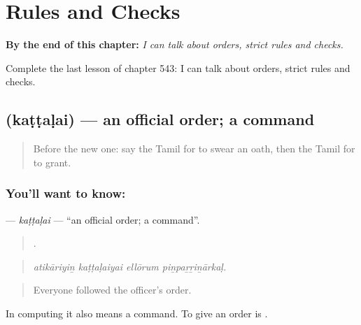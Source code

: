 
\chapter{Rules and Checks}
\label{ch:ta-rules-and-checks}

\begin{chapteropening}
\textbf{By the end of this chapter:} \emph{I can talk about orders, strict rules and checks.}

Complete the last lesson of chapter 543: I can talk about orders, strict rules and checks.
\end{chapteropening}

\section[\texorpdfstring{\ta{கட்டளை} (kaṭṭaḷai)}{கட்டளை (kaṭṭaḷai)}]{ (kaṭṭaḷai) — an official order; a command}

\label{lesson:TA-C543-kattalai}



\begin{quote}
Before the new one: say the Tamil for to swear an oath, then the Tamil for to grant.
\end{quote}

\subsection*{You'll want to know: }
\textbf{} — \emph{kaṭṭaḷai} — \textquotedblleft{}an official order; a command\textquotedblright{}.

\begin{quote}
   .
\end{quote}

\begin{quote}
\emph{atikāriyiṉ kaṭṭaḷaiyai ellōrum piṉpaṟṟiṉārkaḷ.}
\end{quote}

\begin{quote}
Everyone followed the officer's order.
\end{quote}

In computing it also means a command. To give an order is  .

